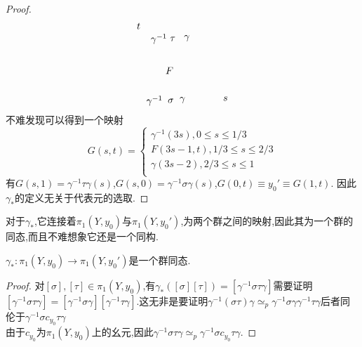 \documentclass{article}
\begin{document}
\begin{proof}
\[\begin{tikzpicture}[x=0.75pt,y=0.75pt,yscale=-1,xscale=1]
        \draw (124,63.4) node [anchor=north west][inner sep=0.75pt]    {$t$};
        \draw (241.11,163.4) node [anchor=north west][inner sep=0.75pt]    {$s$};
        \draw (137,162.4) node [anchor=north west][inner sep=0.75pt]    {$\gamma ^{-1}$};
        \draw (166,166.4) node [anchor=north west][inner sep=0.75pt]    {$\sigma $};
        \draw (182.11,164.06) node [anchor=north west][inner sep=0.75pt]    {$\gamma $};
        \draw (143,78.18) node [anchor=north west][inner sep=0.75pt]    {$\gamma ^{-1}$};
        \draw (169,82.18) node [anchor=north west][inner sep=0.75pt]    {$\tau $};
        \draw (188.11,79.84) node [anchor=north west][inner sep=0.75pt]    {$\gamma $};
        \draw (163,123.4) node [anchor=north west][inner sep=0.75pt]    {$F$};
        \end{tikzpicture}\]        
        不难发现可以得到一个映射
        $$
        G(s,t) = \left\{
            \begin{array}{c}
                \gamma^{-1}(3s),0\leq s \leq 1/3\\
                F(3s-1,t),1/3\leq s \leq 2/3\\
                \gamma(3s - 2), 2/3 \leq s \leq 1\\
            \end{array}
        \right.
        $$
        有$G(s,1) = \gamma^{-1}\tau \gamma(s)$,$G(s,0) = \gamma^{-1} \sigma \gamma(s)$,$G(0,t) \equiv y_0' \equiv G(1,t)$.
        因此$\gamma_*$的定义无关于代表元的选取.
    \end{proof}
    对于$\gamma_*$,它连接着$\pi_1(Y,y_0)$与$\pi_1(Y,y_0')$,为两个群之间的映射,因此其为一个群的同态,而且不难想象它还是一个同构.
    \begin{lemma}
        $\gamma_*: \pi_1(Y,y_0) \to \pi_1(Y,y_0')$是一个群同态.
        \label{lem:2.4.6}
    \end{lemma}
    \begin{proof}
        对$[\sigma],[\tau] \in \pi_1(Y,y_0)$,有$\gamma_*([\sigma][\tau]) = [\gamma^{-1} \sigma \tau \gamma]$需要证明$[\gamma^{-1} \sigma \tau \gamma] = [\gamma^{-1} \sigma\gamma][\gamma^{-1} \tau \gamma]$.这无非是要证明$\gamma^{-1}(\sigma \tau)\gamma \simeq_p \gamma^{-1}\sigma\gamma \gamma^{-1} \tau \gamma$后者同伦于$\gamma^{-1} \sigma c_{y_0} \tau \gamma$\\
        由于$c_{y_0}$为$\pi_1(Y,y_0)$上的幺元,因此$\gamma^{-1} \sigma \tau \gamma \simeq_p \gamma^{-1}\sigma c_{y_0} \tau \gamma$.
    \end{proof}
\end{document}
